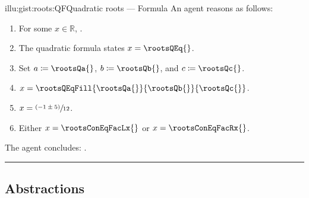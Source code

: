 \documentclass[10pt]{article}
\begin{document}
\begin{note}
\begin{minipage}{.5\linewidth}
\begin{rscenariox}{illu:gist:roots:QF}{Quadratic roots --- Formula}
      An agent reasons as follows:
      \begin{enumerate}[label=\arabic*., ref=\arabic*]
      \item
        \label{illu:gist:roots:QF:eq}
        For some \(x \in \mathbb{R}\), \rootsConEq{}.
      \item
        \label{illu:gist:roots:QF:qf}
        The quadratic formula states \(x = \rootsQEq{}\).
      \item
        \label{illu:gist:roots:QF:subs}
        Set \(a \coloneq \rootsQa{}\), \(b \coloneq \rootsQb{}\), and \(c \coloneq \rootsQc{}\).%
      \item
        \label{illu:gist:roots:QF:qf-subs}
        \(x = \rootsQEqFill{\rootsQa{}}{\rootsQb{}}{\rootsQc{}}\).
      \item
        \label{illu:gist:roots:QF:qf:1}
        \(x = \sfrac{(- 1 \pm 5)}{12}\).
      \item
        \label{illu:gist:roots:QF:qf:done}
        Either \(x = \rootsConEqFacLx{}\) or \(x = \rootsConEqFacRx{}\).
      \end{enumerate}
      The agent concludes:
      \rootsCon{}.
    \end{rscenariox}
  \end{minipage}
  \par\noindent\rule{\textwidth}{0.4pt}

\end{note}

\begin{note}

\end{note}


\subsection{Abstractions}
\end{document}
